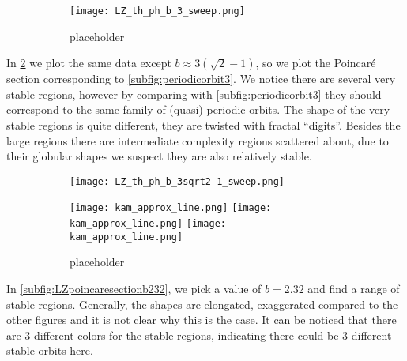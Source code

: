 \begin{figure}[!th]
\centering
\hfill
\begin{subfigure}[h]{0.49\textwidth}
\centering
\texttt{[image: LZ\_th\_ph\_b\_3\_sweep.png]}
\caption{}
\label{subfig:LZpoincaresectionb3}
\end{subfigure}
%
\begin{subfigure}[h]{0.49\textwidth}
\centering
%
%
\caption{placeholder}
\end{subfigure}
\caption{}
\end{figure}


In \cref{subfig:LZpoincaresectionb1242} we plot the same data except $b\approx3(\sqrt2-1)$, so we plot the Poincar\'e section corresponding to \cref{subfig:periodicorbit3}. We notice there are several very stable regions, however by comparing with \cref{subfig:periodicorbit3} they should correspond to the same family of (quasi)-periodic orbits. The shape of the very stable regions is quite different, they are twisted with fractal ``digits''. Besides the large regions there are intermediate complexity regions scattered about, due to their globular shapes we suspect they are also relatively stable.

\begin{figure}[!th]
\centering
\hfill
\begin{subfigure}[h]{0.49\textwidth}
\centering
\texttt{[image: LZ\_th\_ph\_b\_3sqrt2-1\_sweep.png]}
\caption{}
\label{subfig:LZpoincaresectionb1242}
\end{subfigure}
%
\hfill
\begin{subfigure}[h]{0.49\textwidth}
\centering
\texttt{[image: kam\_approx\_line.png]}
%
\texttt{[image: kam\_approx\_line.png]}
%
\texttt{[image: kam\_approx\_line.png]}
\caption{placeholder}
\end{subfigure}
\hfill
\caption{}
\end{figure}

In \cref{subfig:LZpoincaresectionb232}, we pick a value of $b=2.32$ and find a range of stable regions. Generally, the shapes are elongated, exaggerated compared to the other figures and it is not clear why this is the case. It can be noticed that there are 3 different colors for the stable regions, indicating there could be 3 different stable orbits here.

